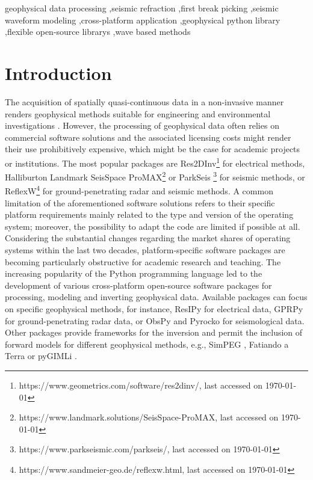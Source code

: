 \documentclass[a4paper,fleqn]{cas-sc}
\begin{document}
\begin{keywords}
geophysical data processing \sep seismic refraction \sep first break picking \sep seismic waveform modeling \sep cross-platform application \sep geophysical python library \sep flexible open-source librarys \sep wave based methods
\end{keywords}

\maketitle 

\printcredits

\doublespacing

\section{Introduction}
\label{intro}

The acquisition of spatially quasi-continuous data in a non-invasive manner renders geophysical methods suitable for engineering and environmental investigations \citep[e.g.,][]{parsekian2015, nguyen2018, romero2019}.
However, the processing of geophysical data often relies on commercial software solutions and the associated licensing costs might render their use prohibitively expensive, which might be the case for academic projects or institutions.
The most popular packages are Res2DInv\footnote{https://www.geometrics.com/software/res2dinv/, last accessed on \today} for electrical methods, Halliburton Landmark SeisSpace ProMAX\footnote{https://www.landmark.solutions/SeisSpace-ProMAX, last accessed on \today} or ParkSeis \footnote{https://www.parkseismic.com/parkseis/, last accessed on \today} for seismic methods, or ReflexW\footnote{https://www.sandmeier-geo.de/reflexw.html, last accessed on \today} for ground-penetrating radar and seismic methods.
A common limitation of the aforementioned software solutions refers to their specific platform requirements mainly related to the type and version of the operating system; moreover, the possibility to adapt the code are limited if possible at all. Considering the substantial changes regarding the market shares of operating systems within the last two decades, platform-specific software packages are becoming particularly obstructive for academic research and teaching.
The increasing popularity of the Python programming language led to the development of various cross-platform open-source software packages for processing, modeling and inverting geophysical data. Available packages can focus on specific geophysical methods, for instance, ResIPy \citep{blanchy2020} for electrical data, GPRPy \citep{plattner2020} for ground-penetrating radar data, or ObsPy \citep{beyreuther2010} and Pyrocko \citep{heimann2017} for seismological data. Other packages provide frameworks for the inversion and permit the inclusion of forward models for different geophysical methods, e.g., SimPEG \citep{cockett2015}, Fatiando a Terra \citep{uieda2013} or pyGIMLi \citep{ruecker2017}. 
\end{document}
